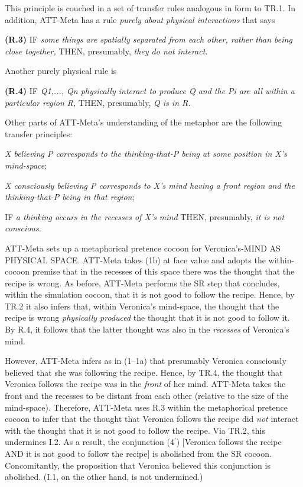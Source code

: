 \noindent This principle is couched in a set of transfer rules
analogous in form to TR.1. 
In addition, ATT-Meta has a rule {\it purely about
physical interactions} that says 

\addtolength{\baselineskip}{-.375\baselineskip}

{\bf (R.3)} 
IF {\it some things are spatially separated from each other, rather than being
close together,} THEN, presumably, {\it they do not interact.}

Another purely physical rule is 

{\bf (R.4)} 
IF {\it Q1,..., Qn physically interact to produce Q and the Pi are all within a
particular region R,} THEN, presumably, {\it Q is in R.}

\addtolength{\baselineskip}{+.6\baselineskip}

Other parts of ATT-Meta's understanding of the metaphor are the
following transfer principles:

\addtolength{\baselineskip}{-.375\baselineskip}

\hang{} 
{\it X believing P corresponds to the thinking-that-P being at some position in
X's mind-space};

\hang{} 
{\it X consciously believing P corresponds to X's mind having a front region and
the thinking-that-P being in that region};

\hang{} 
IF {\it a thinking occurs in the recesses of X's mind} THEN, presumably, {\it it is not conscious.}

\addtolength{\baselineskip}{+.6\baselineskip}

\noindent 
ATT-Meta sets up a metaphorical pretence cocoon for Veronica's-MIND AS PHYSICAL
SPACE.  ATT-Meta takes (1b) at face value and adopts the within-cocoon premise
that in the recesses of this space there was the thought that the recipe is
wrong. As before, ATT-Meta performs the SR step that
concludes, within the simulation cocoon, that it is not good to follow the
recipe. Hence, by TR.2 it also infers that, within Veronica's mind-space, the
thought that the recipe is wrong {\it physically produced} the thought that it
is not good to follow it.  By R.4, it follows that the latter thought was also
in the {\it recesses} of Veronica's mind.

However, ATT-Meta infers as in (1--1a) that presumably Veronica consciously
believed that she was following the recipe. Hence, by TR.4, the thought that
Veronica follows the recipe was in the {\it front} of her mind.  ATT-Meta takes
the front and the recesses to be distant from each other (relative to the size
of the mind-space). Therefore, ATT-Meta uses R.3 within the metaphorical
pretence cocoon to infer that the thought that Veronica follows the recipe did
{\it not} interact with the thought that it is not good to follow the recipe.
Via TR.2, this undermines I.2. As a result, the conjunction (4$^\prime$) [Veronica follows
the recipe AND it is not good to follow the recipe] is abolished from the
SR cocoon. Concomitantly, the proposition that Veronica
believed this conjunction is abolished. (I.1, on the other hand, is not
undermined.)

